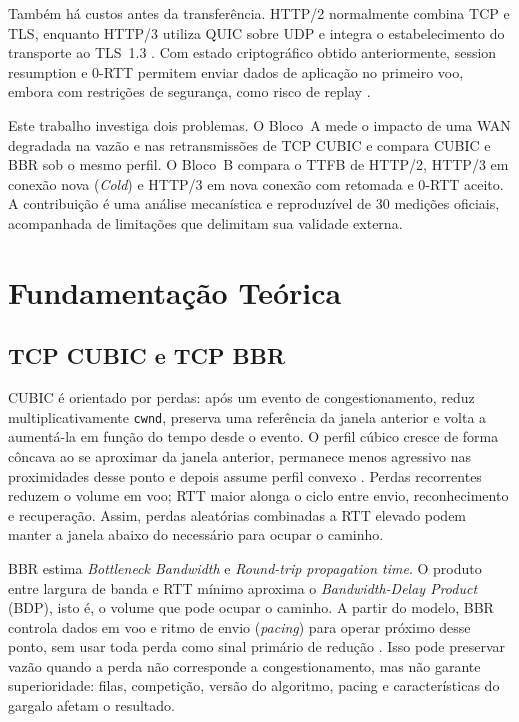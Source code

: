 \documentclass[12pt]{article}
\begin{document}
Também há custos antes da transferência. HTTP/2 normalmente combina TCP e TLS, enquanto HTTP/3 utiliza QUIC sobre UDP e integra o estabelecimento do transporte ao TLS~1.3 \cite{rfc9000,rfc9001,rfc9114}. Com estado criptográfico obtido anteriormente, session resumption e 0-RTT permitem enviar dados de aplicação no primeiro voo, embora com restrições de segurança, como risco de replay \cite{rfc8446}.

Este trabalho investiga dois problemas. O Bloco~A mede o impacto de uma WAN degradada na vazão e nas retransmissões de TCP CUBIC e compara CUBIC e BBR sob o mesmo perfil. O Bloco~B compara o TTFB de HTTP/2, HTTP/3 em conexão nova (\emph{Cold}) e HTTP/3 em nova conexão com retomada e 0-RTT aceito. A contribuição é uma análise mecanística e reproduzível de 30 medições oficiais, acompanhada de limitações que delimitam sua validade externa.

\section{Fundamentação Teórica}

\subsection{TCP CUBIC e TCP BBR}

CUBIC é orientado por perdas: após um evento de congestionamento, reduz multiplicativamente \texttt{cwnd}, preserva uma referência da janela anterior e volta a aumentá-la em função do tempo desde o evento. O perfil cúbico cresce de forma côncava ao se aproximar da janela anterior, permanece menos agressivo nas proximidades desse ponto e depois assume perfil convexo \cite{rfc9438}. Perdas recorrentes reduzem o volume em voo; RTT maior alonga o ciclo entre envio, reconhecimento e recuperação. Assim, perdas aleatórias combinadas a RTT elevado podem manter a janela abaixo do necessário para ocupar o caminho.

BBR estima \emph{Bottleneck Bandwidth} e \emph{Round-trip propagation time}. O produto entre largura de banda e RTT mínimo aproxima o \emph{Bandwidth-Delay Product} (BDP), isto é, o volume que pode ocupar o caminho. A partir do modelo, BBR controla dados em voo e ritmo de envio (\emph{pacing}) para operar próximo desse ponto, sem usar toda perda como sinal primário de redução \cite{cardwell2016bbr}. Isso pode preservar vazão quando a perda não corresponde a congestionamento, mas não garante superioridade: filas, competição, versão do algoritmo, pacing e características do gargalo afetam o resultado.
\end{document}
